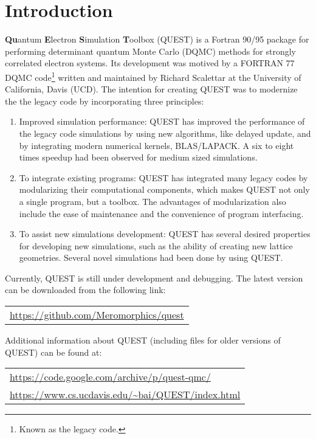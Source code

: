 \documentclass[12pt]{article}
\begin{document}
\section{Introduction}\label{sec intro}
    \textbf{Qu}antum \textbf{E}lectron \textbf{S}imulation \textbf{T}oolbox (QUEST) is a Fortran 90/95 package for performing determinant quantum Monte Carlo (DQMC) methods for strongly correlated electron systems.
    Its development was motived by a FORTRAN 77 DQMC code\footnote{Known as the legacy code.} written and maintained by Richard Scalettar at the University of California, Davis (UCD).
    The intention for creating QUEST was to modernize the the legacy code by incorporating three principles:
    \begin{enumerate}
        \item Improved simulation performance: QUEST has improved the performance of the legacy code simulations by using new algorithms, like delayed update, and by integrating modern numerical kernels, BLAS/LAPACK. A six to eight times speedup had been observed for medium sized simulations.
        \item To integrate existing programs: QUEST has integrated many legacy codes by modularizing their computational components, which makes QUEST not only a single program, but a toolbox. The advantages of modularization also include the ease of maintenance and the convenience of program interfacing.
        \item To assist new simulations development: QUEST has several desired properties for developing new simulations, such as the ability of creating new lattice geometries. Several novel simulations had been done by using QUEST.
    \end{enumerate}
    Currently, QUEST is still under development and debugging.
    The latest version can be downloaded from the following link:
    \begin{center}
    \begin{tabular}{l}
        \url{https://github.com/Meromorphics/quest}
    \end{tabular}
    \end{center}
    Additional information about QUEST (including files for older versions of QUEST) can be found at:
    \begin{center}
      \begin{tabular}{l}
          \url{https://code.google.com/archive/p/quest-qmc/} \\
          \url{https://www.cs.ucdavis.edu/~bai/QUEST/index.html}
    \end{tabular}
    \end{center}
\end{document}
